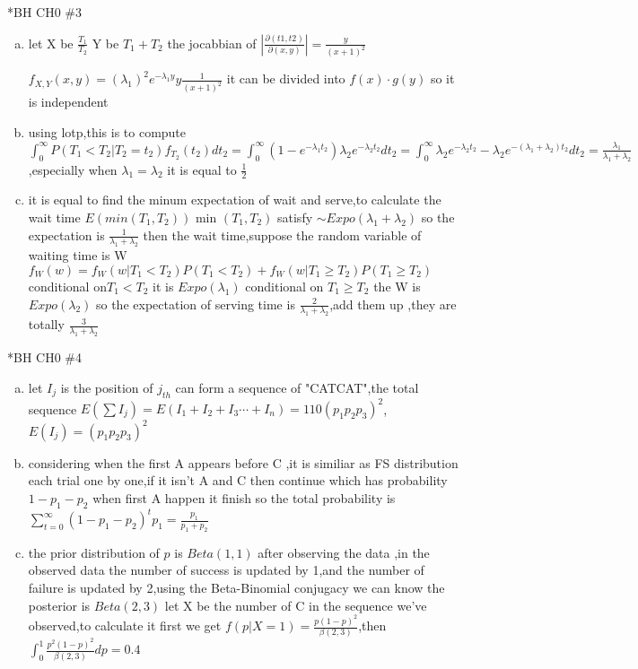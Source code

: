 \documentclass{article}
\begin{document}
\begin{homeworkProblem}*{BH CH0 \#3}
	\begin{enumerate}[(a)]
	\item let X be $\frac{T_1}{T_2}$ Y be $T_1+T_2$ the jocabbian of $|\frac{\partial(t1,t2)}{\partial(x,y)}|=\frac{y}{(x+1)^{2}}$

	$f_{X,Y}(x,y)=(\lambda_1)^{2}e^{-\lambda_1y}y\frac{1}{(x+1)^{2}}$ it can be divided into $f(x)\cdot g(y)$ so it is independent
	\item using lotp,this is to compute $\int _{0}^{\infty}P(T_1< T_2|T_2=t_2)f_{T_2}(t_2)dt_2=\int_{0}^{\infty}(1-e^{-\lambda_1t_2})\lambda_2e^{-\lambda_2t_2}dt_2=\int_{0}^{\infty}\lambda_2e^{-\lambda_2t_2}-\lambda_2e^{-(\lambda_1+\lambda_2)t_2}dt_2=\frac{\lambda_1}{\lambda_1+\lambda_2}$,especially when $\lambda_1=\lambda_2$ it is equal to $\frac{1}{2}$
\item it is equal to find the minum expectation of wait and serve,to calculate the wait time $E(min(T_1,T_2))$ min $(T_1,T_2)$ satisfy $\sim Expo(\lambda_1+\lambda_2)$ so the expectation is $\frac{1}{\lambda_1+\lambda_2}$ then the wait time,suppose the random variable of waiting time is W $f_{W}(w)=f_{W}(w|T_1<T_2)P(T_1<T_2)+f_{W}(w|T_1\geq T_2)P(T_1\geq T_2)$ conditional on$T_1<T_2$ it is $Expo(\lambda_1)$ conditional on $T_1\geq T_2$  the W is $Expo(\lambda_2)$ so the expectation of serving time is $\frac{2}{\lambda_1+\lambda_2}$,add them up ,they are totally $\frac{3}{\lambda_1+\lambda_2}$
\end{enumerate}
\end{homeworkProblem}
\begin{homeworkProblem}*{BH CH0 \#4}
	\begin{enumerate}[(a)]
\item let $I_j$ is the position of $j_{th}$ can form a sequence of "CATCAT",the total sequence $E(\sum I_j)=E(I_1+I_2+I_3\cdots +I_n)=110(p_1p_2p_3)^{2}$,$E(I_j)=(p_1p_2p_3)^{2}$
\item considering when the first A appears before C ,it is similiar as FS distribution each trial one by one,if it isn't A and C then continue which has probability $1-p_1-p_2$ when first A  happen it finish  so the total probability is $\sum_{t=0}^{\infty}(1-p_1-p_2)^{t}p_1=\frac{p_1}{p_1+p_2}$
\item the prior distribution of $p$ is $Beta(1,1)$ after observing the data ,in the observed data the number of success is updated by 1,and the number of failure is updated by 2,using the Beta-Binomial conjugacy we can know the posterior is $Beta(2,3)$ let X be the number of C in the sequence we've observed,to calculate it first we get $f(p|X=1)=\frac{p(1-p)^{2}}{\beta(2,3)}$,then $\int_{0}^{1}\frac{p^{2}(1-p)^{2}}{\beta(2,3)}dp=0.4$  
\end{enumerate}
\end{homeworkProblem}
\end{document}
